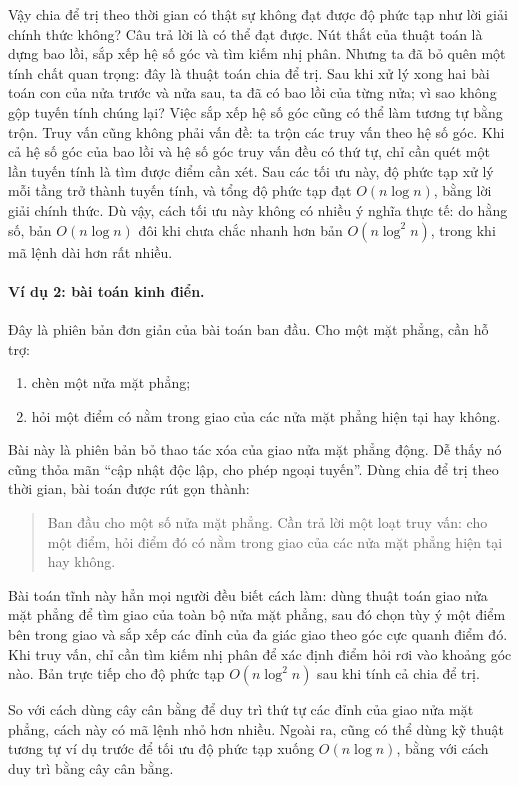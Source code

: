 \documentclass[11pt]{article}
\begin{document}
Vậy chia để trị theo thời gian có thật sự không đạt được độ phức tạp như lời
giải chính thức không? Câu trả lời là có thể đạt được. Nút thắt của thuật
toán là dựng bao lồi, sắp xếp hệ số góc và tìm kiếm nhị phân. Nhưng ta đã bỏ
quên một tính chất quan trọng: đây là thuật toán chia để trị. Sau khi xử lý
xong hai bài toán con của nửa trước và nửa sau, ta đã có bao lồi của từng
nửa; vì sao không gộp tuyến tính chúng lại? Việc sắp xếp hệ số góc cũng có
thể làm tương tự bằng trộn. Truy vấn cũng không phải vấn đề: ta trộn các
truy vấn theo hệ số góc. Khi cả hệ số góc của bao lồi và hệ số góc truy vấn
đều có thứ tự, chỉ cần quét một lần tuyến tính là tìm được điểm cần xét.
Sau các tối ưu này, độ phức tạp xử lý mỗi tầng trở thành tuyến tính, và tổng
độ phức tạp đạt \(O(n\log n)\), bằng lời giải chính thức. Dù vậy, cách tối
ưu này không có nhiều ý nghĩa thực tế: do hằng số, bản \(O(n\log n)\) đôi
khi chưa chắc nhanh hơn bản \(O(n\log^2 n)\), trong khi mã lệnh dài hơn rất
nhiều.

\paragraph{Ví dụ 2: bài toán kinh điển.}
Đây là phiên bản đơn giản của bài toán ban đầu. Cho một mặt phẳng, cần hỗ trợ:
\begin{enumerate}
  \item chèn một nửa mặt phẳng;
  \item hỏi một điểm có nằm trong giao của các nửa mặt phẳng hiện tại hay
  không.
\end{enumerate}

Bài này là phiên bản bỏ thao tác xóa của giao nửa mặt phẳng động. Dễ thấy nó
cũng thỏa mãn ``cập nhật độc lập, cho phép ngoại tuyến''. Dùng chia để trị
theo thời gian, bài toán được rút gọn thành:
\begin{quote}
Ban đầu cho một số nửa mặt phẳng. Cần trả lời một loạt truy vấn: cho một
điểm, hỏi điểm đó có nằm trong giao của các nửa mặt phẳng hiện tại hay
không.
\end{quote}

Bài toán tĩnh này hẳn mọi người đều biết cách làm: dùng thuật toán giao nửa
mặt phẳng để tìm giao của toàn bộ nửa mặt phẳng, sau đó chọn tùy ý một điểm
bên trong giao và sắp xếp các đỉnh của đa giác giao theo góc cực quanh điểm
đó. Khi truy vấn, chỉ cần tìm kiếm nhị phân để xác định điểm hỏi rơi vào
khoảng góc nào. Bản trực tiếp cho độ phức tạp \(O(n\log^2 n)\) sau khi tính
cả chia để trị.

So với cách dùng cây cân bằng để duy trì thứ tự các đỉnh của giao nửa mặt
phẳng, cách này có mã lệnh nhỏ hơn nhiều. Ngoài ra, cũng có thể dùng kỹ
thuật tương tự ví dụ trước để tối ưu độ phức tạp xuống \(O(n\log n)\), bằng
với cách duy trì bằng cây cân bằng.
\end{document}
